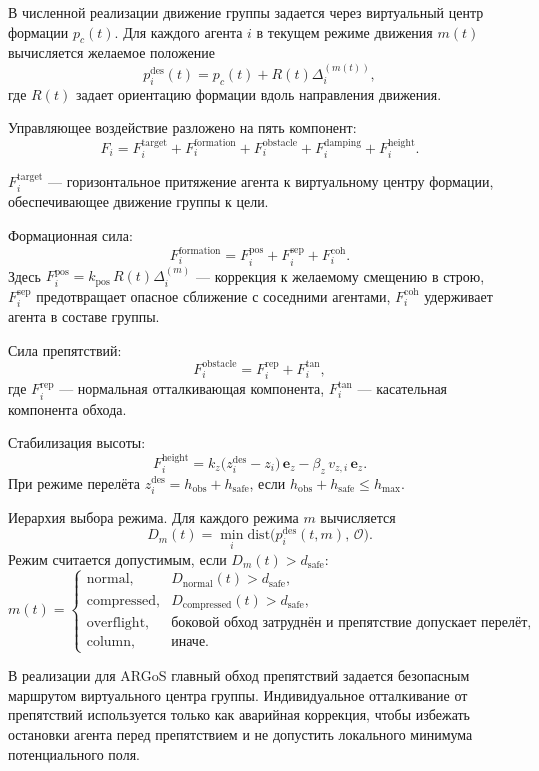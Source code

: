 
В численной реализации движение группы задается через виртуальный центр
формации $p_c(t)$. Для каждого агента $i$ в текущем режиме движения
$m(t)$ вычисляется желаемое положение
\[
    p_i^{\mathrm{des}}(t)=p_c(t)+R(t)\Delta_i^{(m(t))},
\]
где $R(t)$ задает ориентацию формации вдоль направления движения.

Управляющее воздействие разложено на пять компонент:
\[
    F_i = F_i^{\mathrm{target}}
        + F_i^{\mathrm{formation}}
        + F_i^{\mathrm{obstacle}}
        + F_i^{\mathrm{damping}}
        + F_i^{\mathrm{height}}.
\]

$F_i^{\mathrm{target}}$ — горизонтальное притяжение агента к виртуальному
центру формации, обеспечивающее движение группы к цели.

Формационная сила:
\[
    F_i^{\mathrm{formation}}
    =
    F_i^{\mathrm{pos}}+F_i^{\mathrm{sep}}+F_i^{\mathrm{coh}}.
\]
Здесь $F_i^{\mathrm{pos}} = k_{\mathrm{pos}}\,R(t)\Delta_i^{(m)}$ —
коррекция к желаемому смещению в строю, $F_i^{\mathrm{sep}}$ предотвращает
опасное сближение с соседними агентами, $F_i^{\mathrm{coh}}$ удерживает
агента в составе группы.

Сила препятствий:
\[
    F_i^{\mathrm{obstacle}} = F_i^{\mathrm{rep}} + F_i^{\mathrm{tan}},
\]
где $F_i^{\mathrm{rep}}$ — нормальная отталкивающая компонента,
$F_i^{\mathrm{tan}}$ — касательная компонента обхода.

Стабилизация высоты:
\[
    F_i^{\mathrm{height}}
    = k_z\bigl(z_i^{\mathrm{des}} - z_i\bigr)\,\mathbf{e}_z
    - \beta_z\,v_{z,i}\,\mathbf{e}_z.
\]
При режиме перелёта $z_i^{\mathrm{des}} = h_{\mathrm{obs}} + h_{\mathrm{safe}}$,
если $h_{\mathrm{obs}} + h_{\mathrm{safe}} \leq h_{\max}$.

Иерархия выбора режима. Для каждого режима $m$ вычисляется
\[
    D_m(t) = \min_i \mathrm{dist}\!\bigl(p_i^{\mathrm{des}}(t,m),\,\mathcal{O}\bigr).
\]
Режим считается допустимым, если $D_m(t)>d_{\mathrm{safe}}$:
\[
    m(t)=
    \begin{cases}
        \text{normal},     & D_{\mathrm{normal}}(t) > d_{\mathrm{safe}},\\
        \text{compressed}, & D_{\mathrm{compressed}}(t) > d_{\mathrm{safe}},\\
        \text{overflight}, & \text{боковой обход затруднён и препятствие допускает перелёт},\\
        \text{column},     & \text{иначе}.
    \end{cases}
\]

В реализации для ARGoS главный обход препятствий задается безопасным
маршрутом виртуального центра группы. Индивидуальное отталкивание от
препятствий используется только как аварийная коррекция, чтобы избежать
остановки агента перед препятствием и не допустить локального минимума
потенциального поля.
